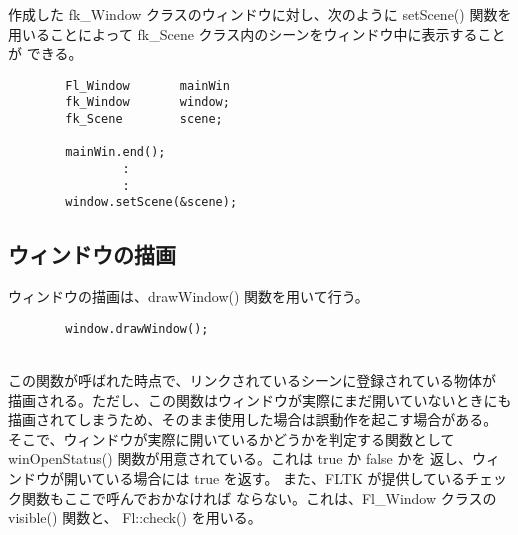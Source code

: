 作成した fk\_Window クラスのウィンドウに対し、次のように
setScene() 関数を用いることによって
fk\_Scene クラス内のシーンをウィンドウ中に表示することが
できる。
\\
\begin{breakbox}
\begin{verbatim}
        Fl_Window       mainWin
        fk_Window       window;
        fk_Scene        scene;

        mainWin.end();
                :
                :
        window.setScene(&scene);
\end{verbatim}
\end{breakbox}

\subsection{ウィンドウの描画}
ウィンドウの描画は、drawWindow() 関数を用いて行う。
\\
\begin{screen}
\begin{verbatim}
        window.drawWindow();
\end{verbatim}
\end{screen}
~ \\
この関数が呼ばれた時点で、リンクされているシーンに登録されている物体が
描画される。ただし、この関数はウィンドウが実際にまだ開いていないときにも
描画されてしまうため、そのまま使用した場合は誤動作を起こす場合がある。
そこで、ウィンドウが実際に開いているかどうかを判定する関数として
winOpenStatus() 関数が用意されている。これは true か false かを
返し、ウィンドウが開いている場合には true を返す。
また、FLTK が提供しているチェック関数もここで呼んでおかなければ
ならない。これは、Fl\_Window クラスの visible() 関数と、
Fl::check() を用いる。

